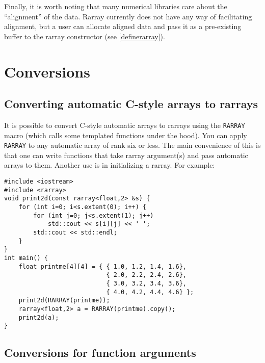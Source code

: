\documentclass[11pt,twoside]{article}
\begin{document}
Finally, it is worth noting that many numerical libraries care about
the ``alignment'' of the data.  Rarray currently does not have any way of
facilitating alignment, but a user can allocate aligned
data and pass it as a pre-existing buffer to the rarray constructor
(see \ref{definerarray}).

\section{Conversions}

\subsection{Converting automatic C-style arrays to rarrays}

It is possible to convert C-style automatic arrays to rarrays using the {\tt RARRAY} macro (which calls some templated functions under the hood).  You can apply {\tt RARRAY} to any automatic array of rank six or less. 
The main convenience of this is that one can write functions that take rarray argument(s) and pass automatic arrays to them. Another use is in initializing a rarray. For example:
\vspace{-5pt}\begin{framed}\vspace{-14pt}%
\begin{verbatim}
#include <iostream>
#include <rarray>
void print2d(const rarray<float,2> &s) {
    for (int i=0; i<s.extent(0); i++) {
        for (int j=0; j<s.extent(1); j++)
            std::cout << s[i][j] << ' ';
        std::cout << std::endl;
    }
}
int main() {
    float printme[4][4] = { { 1.0, 1.2, 1.4, 1.6},
                            { 2.0, 2.2, 2.4, 2.6},
                            { 3.0, 3.2, 3.4, 3.6},
                            { 4.0, 4.2, 4.4, 4.6} };
    print2d(RARRAY(printme));
    rarray<float,2> a = RARRAY(printme).copy();
    print2d(a);
}
\end{verbatim}%
\vspace{-14pt}\end{framed}\vspace{-8pt}



\subsection{Conversions for function arguments}
\end{document}
